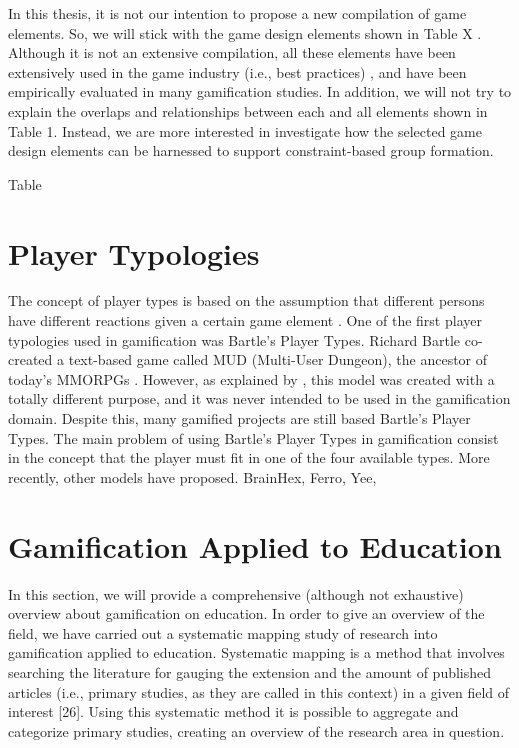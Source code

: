 In this thesis, it is not our intention to propose a new compilation of game elements. So, we will stick with the game design elements shown in Table X . Although it is not an extensive compilation, all these elements have been extensively used in the game industry (i.e., best practices) \cite{ferro2016gamification}, and have been empirically evaluated in many gamification studies\cite{Sailer2017}. In addition, we will not try to explain the overlaps and relationships between each and all elements shown in Table 1. Instead, we are more interested in investigate how the selected game design elements can be harnessed to support constraint-based group formation.

Table 

\section{Player Typologies}
The concept of player types is based on the assumption that different persons have different reactions given a certain game element \cite{fullerton2008}. One of the first player typologies used in gamification was Bartle's Player Types. Richard Bartle co-created a text-based game called MUD (Multi-User Dungeon), the ancestor of today's MMORPGs .
However, as explained by \citeauthor{youtube_bartle}, this model was created with a totally different purpose, and it was never intended to be used in the gamification domain\cite{youtube_bartle}. Despite this, many gamified projects are still based Bartle's Player Types. The main problem of using Bartle's Player Types in gamification consist in the concept that the player must fit in one of the four available types. 
More recently, other models have proposed. BrainHex, Ferro, Yee, 

\section{Gamification Applied to Education}

In this section, we will provide a comprehensive (although not exhaustive) overview about gamification on education. In order to give an overview of the field, we have
carried out a systematic mapping study of research into
gamification applied to education. Systematic mapping is a method
that involves searching the literature for gauging the extension and
the amount of published articles (i.e., primary studies, as they are
called in this context) in a given field of interest [26]. Using this
systematic method it is possible to aggregate and categorize
primary studies, creating an overview of the research area in
question.


